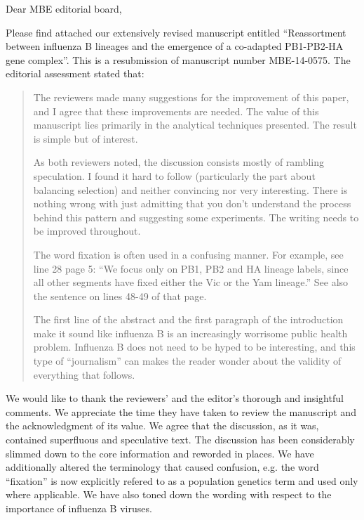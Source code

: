 \documentclass[11pt,oneside,letterpaper]{article}
\begin{document}

Dear MBE editorial board,

Please find attached our extensively revised manuscript entitled ``Reassortment between influenza B lineages and the emergence of a co-adapted PB1-PB2-HA gene complex''.  This is a resubmission of manuscript number MBE-14-0575. The editorial assessment stated that:

\begin{quote}
The reviewers made many suggestions for the improvement of this paper, and I agree that these improvements are needed. 
The value of this manuscript lies primarily in the analytical techniques presented. 
The result is simple but of interest.

As both reviewers noted, the discussion consists mostly of rambling speculation. 
I found it hard to follow (particularly the part about balancing selection) and neither convincing nor very interesting. 
There is nothing wrong with just admitting that you don't understand the process behind this pattern and suggesting some experiments. 
The writing needs to be improved throughout.

The word fixation is often used in a confusing manner. 
For example, see line 28 page 5: ``We focus only on PB1, PB2 and HA lineage labels, since all other segments have fixed either the Vic or the Yam lineage.'' 
See also the sentence on lines 48-49 of that page.

The first line of the abstract and the first paragraph of the introduction make it sound like influenza B is an increasingly worrisome public health problem. 
Influenza B does not need to be hyped to be interesting, and this type of ``journalism'' can makes the reader wonder about the validity of everything that follows.
\end{quote}

We would like to thank the reviewers' and the editor's thorough and insightful comments.
We appreciate the time they have taken to review the manuscript and the acknowledgment of its value.
We agree that the discussion, as it was, contained superfluous and speculative text.
The discussion has been considerably slimmed down to the core information and reworded in places.
We have additionally altered the terminology that caused confusion, e.g. the word ``fixation'' is now explicitly refered to as a population genetics term and used only where applicable.
We have also toned down the wording with respect to the importance of influenza B viruses.
\end{document}
